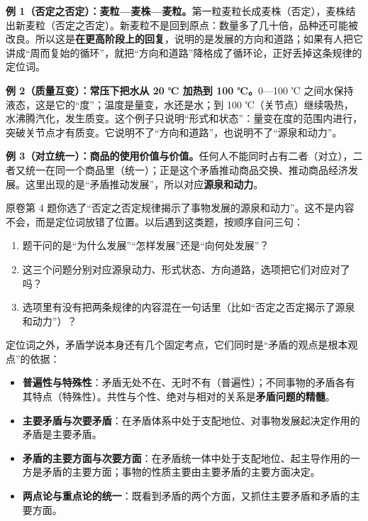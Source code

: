 \documentclass[11pt]{ctexart}
\newcommand{\dw}[1]{\textbf{\color{violetdeep}#1}}   %
\let\origsubhdr\subhdr
\renewcommand{\subhdr}[1]{\par\needspace{4\baselineskip}\origsubhdr{#1}}
\begin{document}

\textbf{例 1（否定之否定）：麦粒—麦株—麦粒。}第一粒麦粒长成麦株（否定），麦株结出新麦粒（否定之否定）。新麦粒不是回到原点：数量多了几十倍，品种还可能被改良。所以这是\dw{在更高阶段上的回复}，说明的是发展的方向和道路；如果有人把它讲成“周而复始的循环”，就把“方向和道路”降格成了循环论，正好丢掉这条规律的定位词。

\textbf{例 2（质量互变）：常压下把水从 20 ℃ 加热到 100 ℃。}0—100 ℃ 之间水保持液态，这是它的“度”；温度是量变，水还是水；到 100 ℃（关节点）继续吸热，水沸腾汽化，发生质变。这个例子只说明“形式和状态”：量变在度的范围内进行，突破关节点才有质变。它说明不了“方向和道路”，也说明不了“源泉和动力”。

\textbf{例 3（对立统一）：商品的使用价值与价值。}任何人不能同时占有二者（对立），二者又统一在同一个商品里（统一）；正是这个矛盾推动商品交换、推动商品经济发展。这里出现的是“矛盾推动发展”，所以对应\dw{源泉和动力}。


原卷第 4 题你选了“否定之否定规律揭示了事物发展的源泉和动力”。这不是内容不会，而是定位词放错了位置。以后遇到这类题，按顺序自问三句：

\begin{enumerate}[label=\arabic*.,leftmargin=2.0em]
\item 题干问的是“为什么发展”“怎样发展”还是“向何处发展”？
\item 这三个问题分别对应源泉动力、形式状态、方向道路，选项把它们对应对了吗？
\item 选项里有没有把两条规律的内容混在一句话里（比如“否定之否定揭示了源泉和动力”）？
\end{enumerate}


定位词之外，矛盾学说本身还有几个固定考点，它们同时是“矛盾的观点是根本观点”的依据：

\begin{itemize}[leftmargin=1.9em]
\item \dw{普遍性与特殊性}：矛盾无处不在、无时不有（普遍性）；不同事物的矛盾各有其特点（特殊性）。共性与个性、绝对与相对的关系是\dw{矛盾问题的精髓}。
\item \dw{主要矛盾与次要矛盾}：在矛盾体系中处于支配地位、对事物发展起决定作用的矛盾是主要矛盾。
\item \dw{矛盾的主要方面与次要方面}：在矛盾统一体中处于支配地位、起主导作用的一方是矛盾的主要方面；事物的性质主要由主要矛盾的主要方面决定。
\item \dw{两点论与重点论的统一}：既看到矛盾的两个方面，又抓住主要矛盾和矛盾的主要方面。
\end{itemize}
\end{document}

